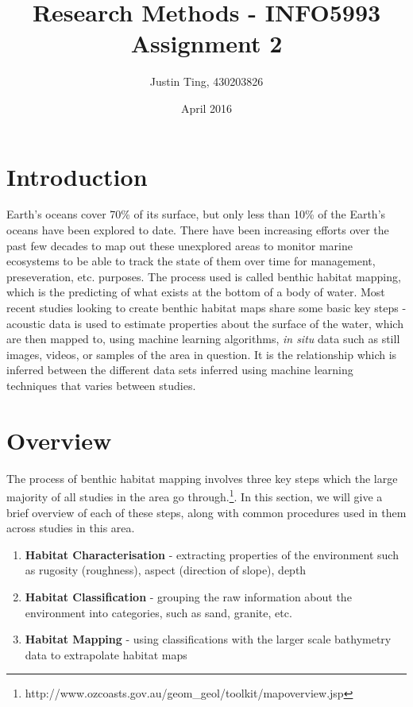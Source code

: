 \documentclass[12pt]{article}
\title{Research Methods - INFO5993 Assignment 2}
\author{Justin Ting, 430203826}
\date{April 2016}
\begin{document}
\maketitle

        \begin{multicols}{2}
            \section{Introduction}

            Earth's oceans cover 70\% of its surface, but only less than 10\% of the Earth's oceans have been explored to date.\cite{NOAA} There have been increasing efforts over the past few decades to map out these unexplored areas to monitor marine ecosystems to be able to track the state of them over time for management, preseveration, etc. purposes. The process used is called benthic habitat mapping, which is the predicting of what exists at the bottom of a body of water. Most recent studies looking to create benthic habitat maps share some basic key steps - acoustic data is used to estimate properties about the surface of the water, which are then mapped to, using machine learning algorithms, \textit{in situ} data such as still images, videos, or samples of the area in question. It is the relationship which is inferred between the different data sets inferred using machine learning techniques that varies between studies.

            \section{Overview}
            The process of benthic habitat mapping involves three key steps which the large majority of all studies in the area go through.\footnote{http://www.ozcoasts.gov.au/geom\_geol/toolkit/mapoverview.jsp}. In this section, we will give a brief overview of each of these steps, along with common procedures used in them across studies in this area.\\

            \begin{enumerate}
                \item \textbf{Habitat Characterisation} - extracting properties of the environment such as rugosity (roughness), aspect (direction of slope), depth
                \item \textbf{Habitat Classification} - grouping the raw information about the environment into categories, such as sand, granite, etc.
                \item \textbf{Habitat Mapping} - using classifications with the larger scale bathymetry data to extrapolate habitat maps 
            \end{enumerate}


\end{multicols}
\end{document}
